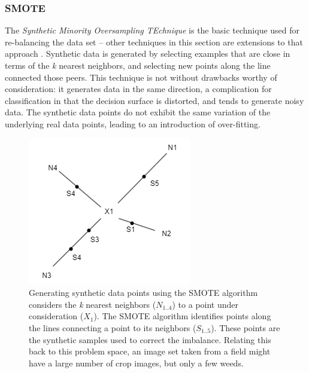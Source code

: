\documentclass[letterpaper]{report}
\begin{document}
\subsubsection{SMOTE}
\label{section:smote}
The \textit{Synthetic Minority Oversampling TEchnique} is the basic technique used for re-balancing the data set -- other techniques in this section are extensions to that approach \parencite{Chawla2002-dk}. Synthetic data is generated by selecting examples that are close in terms of the \textit{k} nearest neighbors, and selecting new points along the line connected those peers. This technique is not without drawbacks worthy of consideration: it generates data in the same direction, a complication for classification in that the decision surface is distorted, and tends to generate noisy data. The synthetic data points do not exhibit the same variation of the underlying real data points, leading to an introduction of over-fitting.
\begin{figure}[H]
	\centering
	\includegraphics[scale=0.35]{./figures/smote.png}
	\caption[SMOTE selection of synthetic data points]{Generating synthetic data points using the SMOTE algorithm considers the \textit{k} nearest neighbors ($N_{1..4}$) to a point under consideration ($X_1$).  The SMOTE algorithm identifies points along the lines connecting a point to its neighbors ($S_{1..5}$). These points are the synthetic samples used to correct the imbalance. Relating this back to this problem space, an image set taken from a field might have a large number of crop images, but only a few weeds.}
	\label{fig:smote}
\end{figure}
\end{document}
